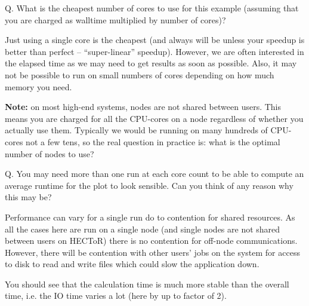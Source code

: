 \documentclass{article}
\begin{document}
Q. What is the cheapest number of cores to use for this example
   (assuming that you are charged as walltime multiplied by number of
   cores)?

Just using a single core is the cheapest (and always will be unless
your speedup is better than perfect -- ``super-linear'' speedup). However, we are often
interested in the elapsed time as we may need to get results as soon
as possible. Also, it may not be possible to run on small numbers of
cores depending on how much memory you need.

{\bf Note:} on most high-end systems, nodes are not shared between
users. This means you are charged for all the CPU-cores on a node
regardless of whether you actually use them. Typically we would be
running on many hundreds of CPU-cores not a few tens, so the real
question in practice is: what is the optimal number of nodes to use?

Q. You may need more than one run at each core count to be able
to compute an average runtime for the plot to look sensible. Can you
think of any reason why this may be?


Performance can vary for a single run do to contention for shared
resources. As all the cases here are run on a single node (and single
nodes are not shared between users on HECToR) there is no contention
for off-node communications. However, there will be contention with
other users' jobs on the system for access to disk to read and write
files which could slow the application down.

You should see that the calculation time is much more stable than the
overall time, i.e. the IO time varies a lot (here by up to factor of
2).
\end{document}
